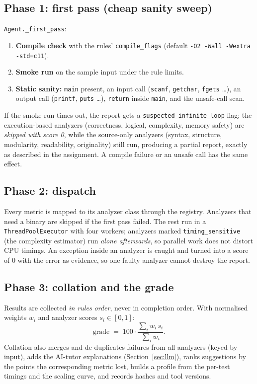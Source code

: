\documentclass[11pt,a4paper]{article}
\newcommand{\fn}[1]{\nolinkurl{#1}}
\begin{document}
\subsection{Phase 1: first pass (cheap sanity sweep)}
\fn{Agent._first_pass}:
\begin{enumerate}
  \item \textbf{Compile check} with the rules' \texttt{compile\_flags} (default \texttt{-O2 -Wall -Wextra -std=c11}).
  \item \textbf{Smoke run} on the sample input under the rule limits.
  \item \textbf{Static sanity:} \texttt{main} present, an input call (\texttt{scanf}, \texttt{getchar}, \texttt{fgets} \ldots),
        an output call (\texttt{printf}, \texttt{puts} \ldots), \texttt{return} inside \texttt{main}, and the unsafe-call scan.
\end{enumerate}
If the smoke run times out, the report gets a \texttt{suspected\_infinite\_loop} flag; the execution-based
analyzers (correctness, logical, complexity, memory safety) are \emph{skipped with score 0}, while the
source-only analyzers (syntax, structure, modularity, readability, originality) still run, producing a
partial report, exactly as described in the assignment. A compile failure or an unsafe call has the same effect.

\subsection{Phase 2: dispatch}
Every metric is mapped to its analyzer class through the registry. Analyzers that need a binary are
skipped if the first pass failed. The rest run in a \fn{ThreadPoolExecutor} with four workers; analyzers
marked \fn{timing_sensitive} (the complexity estimator) run \emph{alone afterwards}, so parallel work does
not distort CPU timings. An exception inside an analyzer is caught and turned into a score of 0 with
the error as evidence, so one faulty analyzer cannot destroy the report.

\subsection{Phase 3: collation and the grade}
Results are collected \emph{in rules order}, never in completion order. With normalised weights
$w_i$ and analyzer scores $s_i \in [0,1]$:
\[
  \text{grade} \;=\; 100 \cdot \frac{\sum_i w_i\, s_i}{\sum_i w_i}.
\]
Collation also merges and de-duplicates failures from all analyzers (keyed by input), adds the AI-tutor
explanations (Section~\ref{sec:llm}), ranks suggestions by the points the corresponding metric lost,
builds a profile from the per-test timings and the scaling curve, and records hashes and tool versions.
\end{document}
